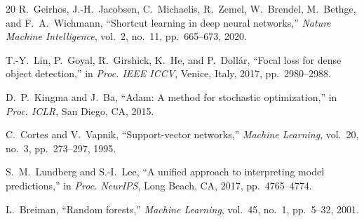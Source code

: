 \documentclass[conference]{IEEEtran}
\begin{document}
\begin{thebibliography}{20}
R.~Geirhos, J.-H.~Jacobsen, C.~Michaelis, R.~Zemel, W.~Brendel, M.~Bethge, and F.~A.~Wichmann, ``Shortcut learning in deep neural networks,'' \textit{Nature Machine Intelligence}, vol.~2, no.~11, pp.~665--673, 2020.

T.-Y.~Lin, P.~Goyal, R.~Girshick, K.~He, and P.~Doll\'{a}r, ``Focal loss for dense object detection,'' in \textit{Proc. IEEE ICCV}, Venice, Italy, 2017, pp.~2980--2988.

D.~P.~Kingma and J.~Ba, ``Adam: A method for stochastic optimization,'' in \textit{Proc. ICLR}, San Diego, CA, 2015.

C.~Cortes and V.~Vapnik, ``Support-vector networks,'' \textit{Machine Learning}, vol.~20, no.~3, pp.~273--297, 1995.

S.~M.~Lundberg and S.-I.~Lee, ``A unified approach to interpreting model predictions,'' in \textit{Proc. NeurIPS}, Long Beach, CA, 2017, pp.~4765--4774.

L.~Breiman, ``Random forests,'' \textit{Machine Learning}, vol.~45, no.~1, pp.~5--32, 2001.

\end{thebibliography}

\balance
\end{document}
